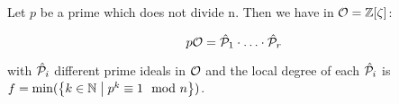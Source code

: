 \begin{Lem}
	Let $p$ be a prime which does not divide n. Then we have in $\mathcal{O} = \mathbb{Z}[\zeta]$:
	
	\[ p \mathcal{O} = \hat{\mathcal{P}}_1 \cdot \ldots \cdot \hat{\mathcal{P}}_r  	\]
	
	with $\hat{\mathcal{P}}_i$ different prime ideals in $\mathcal{O}$ and the local degree of each $\hat{\mathcal{P}}_i$ is \newline $f = \min(\left\{ {k \in \mathbb{N}} \bigm| {p^k \equiv 1 \mod n} \right\})$.
\end{Lem}
